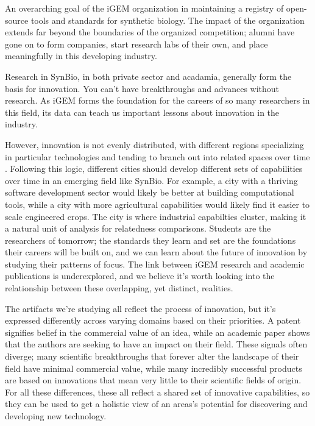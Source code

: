 \documentclass[12pt,a4paper]{article}
\begin{document}
	An overarching goal of the iGEM organization in maintaining a registry of open-source tools and standards for synthetic biology. The impact of the organization extends far beyond the boundaries of the organized competition; alumni have gone on to form companies, start research labs of their own, and place meaningfully in this developing industry.
	
	Research in SynBio, in both private sector and acadamia, generally form the basis for innovation. You can't have breakthroughs and advances without research. As iGEM forms the foundation for the careers of so many researchers in this field, its data can teach us important lessons about innovation in the industry.
	
	However, innovation is not evenly distributed, with different regions specializing in particular technologies and tending to branch out into related spaces over time \parencite{hidalgoProductSpaceConditions2007}. Following this logic, different cities should develop different sets of capabilities over time in an emerging field like SynBio. For example, a city with a thriving software development sector would likely be better at building computational tools, while a city with more agricultural capabilities would likely find it easier to scale engineered crops. The city is where industrial capabilties cluster, making it a natural unit of analysis for relatedness comparisons. Students are the researchers of tomorrow; the standards they learn and set are the foundations their careers will be built on, and we can learn about the future of innovation by studying their patterns of focus. The link between iGEM research and academic publications is underexplored, and we believe it's worth looking into the relationship between these overlapping, yet distinct, realities.
	
	The artifacts we're studying all reflect the process of innovation, but it's expressed differently across varying domains based on their priorities. A patent signifies belief in the commercial value of an idea, while an academic paper shows that the authors are seeking to have an impact on their field. These signals often diverge; many scientific breakthroughs that forever alter the landscape of their field have minimal commercial value, while many incredibly successful products are based on innovations that mean very little to their scientific fields of origin. For all these differences, these all reflect a shared set of innovative capabilities, so they can be used to get a holistic view of an areas's potential for discovering and developing new technology.
	
\end{document}
